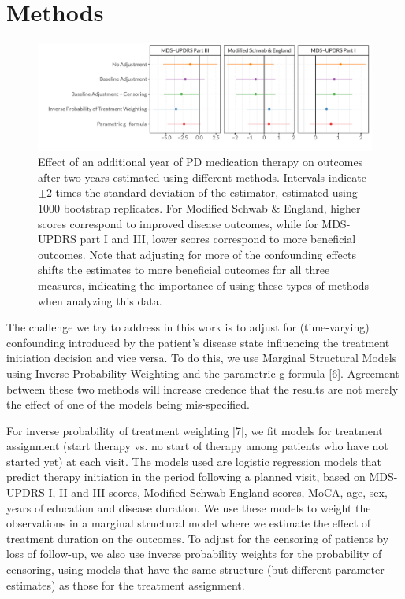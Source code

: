 \documentclass[final]{article}
\begin{document}
\section*{Methods}
\begin{figure}
  \centering
  \includegraphics[width=\textwidth]{different-models.pdf}
  \caption{Effect of an additional year of PD medication therapy on outcomes after two years estimated using different methods. Intervals indicate $\pm 2$ times the standard deviation of the estimator, estimated using $1000$ bootstrap replicates. For Modified Schwab \& England, higher scores correspond to improved disease outcomes, while for MDS-UPDRS part I and III, lower scores correspond to more beneficial outcomes. Note that adjusting for more of the confounding effects shifts the estimates to more beneficial outcomes for all three measures, indicating the importance of using these types of methods when analyzing this data.}
  \label{fig1}
\end{figure}
The challenge we try to address in this work is to adjust for (time-varying) confounding introduced by the patient's disease state influencing the treatment initiation decision and vice versa. To do this, we use Marginal Structural Models using Inverse Probability Weighting and the parametric g-formula [6]. Agreement between these two methods will increase credence that the results are not merely the effect of one of the models being mis-specified.

For inverse probability of treatment weighting [7], we fit models for treatment assignment (start therapy vs. no start of therapy among patients who have not started yet) at each visit. The models used are logistic regression models that predict therapy initiation in the period following a planned visit, based on MDS-UPDRS I, II and III scores, Modified Schwab-England scores, MoCA, age, sex, years of education and disease duration. We use these models to weight the observations in a marginal structural model where we estimate the effect of treatment duration on the outcomes. To adjust for the censoring of patients by loss of follow-up, we also use inverse probability weights for the probability of censoring, using models that have the same structure (but different parameter estimates) as those for the treatment assignment.
\end{document}
